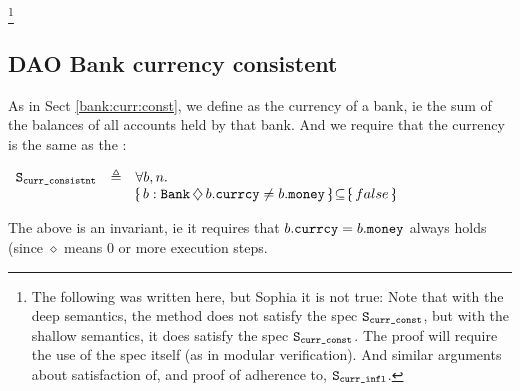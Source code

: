 \footnote{The following was written here, but Sophia  it is not true: Note that with the deep semantics, the method   does not satisfy the spec $ {\texttt{S}}_{{\texttt{curr\_const}}}$, but with the shallow semantics, it does satisfy the spec $ {\texttt{S}}_{{\texttt{curr\_const}}}$. The proof will require the use of the spec itself (as in modular verification). And similar arguments about satisfaction of,  and proof of  adherence to, ${\texttt{S}}_{{\texttt{curr\_infl}}}$.}


  \subsection{DAO Bank currency consistent}
  \label{bank:curr:consist}
 As in Sect \ref{bank:curr:const}, we define as  the currency of a bank, ie the sum of the balances of all accounts held by that bank.
 And we require that the currency is the same as the :
 
 $\begin{array}{lll}
 \Spec{curr\_consistnt} & \triangleq &  \forall b,n.\\
 & &   \onlyIf{b:\prg{Bank}}{b.\prg{currcy}\neq b.\prg{money}} {false}
\end{array}
$

The above is an invariant, ie it requires that ${b.{\texttt{currcy}}= b.{\texttt{money}}}$ always holds (since $\diamond$ means 0 or more execution steps.
 
 
 